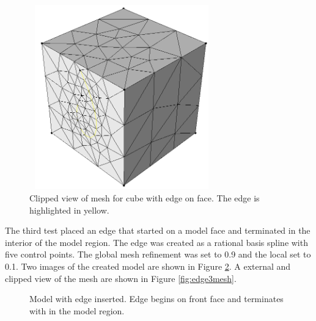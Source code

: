\documentclass[a4paper, 12pt]{article}
\begin{document}
\begin{figure}[H]
  \centering
  \includegraphics[width=8cm, height=8cm]{test7_sms}
  \caption{Clipped view of mesh for cube with edge on face. 
          The edge is highlighted in yellow.}
  \label{fig:edge2mesh}
\end{figure}

The third test placed an edge that started on a model face and 
terminated in the interior of the model region. 
The edge was created as a rational basis spline with five control points.
The global mesh refinement was set to 0.9 and the local set to 0.1. 
Two images of the created model are shown in Figure \ref{fig:edge3model}.
A external and clipped view of the mesh are shown in Figure \ref{fig:edge3mesh}.

\begin{figure}[H]
  \centering
  \caption{Model with edge inserted. Edge begins on front face and terminates 
        with in the model region.}
  \label{fig:edge3model}
\end{figure}
\end{document}
